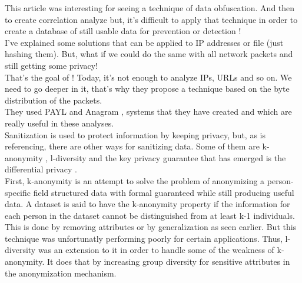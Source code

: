 \documentclass{eplmastersthesis}
\begin{document}
This article was interesting for seeing a technique of data obfuscation. And then to create correlation analyze but, it's difficult to apply that technique in order to create a database of still usable data for prevention or detection !
\\

I've explained some solutions that can be applied to IP addresses or file (just hashing them). But, what if we could do the same with all network packets and still getting some privacy!\\
That's the goal of \cite{parekh2006privacy} ! Today, it's not enough to analyze IPs, URLs and so on. We need to go deeper in it, that's why they propose a technique based on the byte distribution of the packets.\\
They used PAYL and Anagram \cite{wang2006network}, systems that they have created and which are really useful in these analyses.\\

Sanitization is used to protect information by keeping privacy, but, as \cite{mohaisen2017rethinking} is referencing, there are other ways for sanitizing data. Some of them are k-anonymity \cite{sweeney2002k}, l-diversity \cite{machanavajjhala2007diversity} and the key privacy guarantee that has emerged is the differential privacy \cite{dwork2008differential}.\\
First, k-anonymity is an attempt to solve the problem of anonymizing a person-specific field structured data with formal guaranteed while still producing useful data. A dataset is said to have the k-anonymity property if the information for each person in the dataset cannot be distinguished from at least k-1 individuals. This is done by removing attributes or by generalization as seen earlier. But this technique was unfortunatly performing poorly for certain applications. Thus, l-diversity was an extension to it in order to handle some of the weakness of k-anonymity. It does that by increasing group diversity for sensitive attributes in the anonymization mechanism.\\
\end{document}

